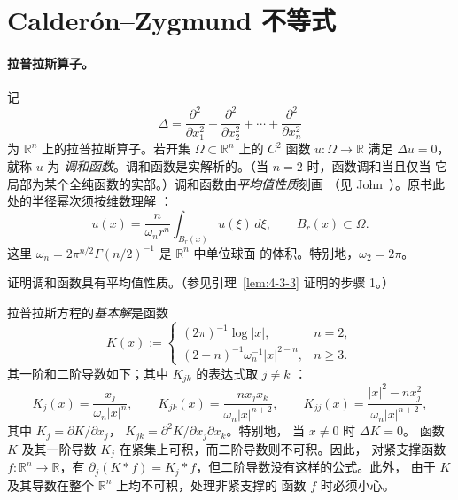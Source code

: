 
\section{Calderón--Zygmund 不等式}\label{sec:B-2}

\paragraph{拉普拉斯算子。}
记
\[
  \Delta=\frac{\partial^2}{\partial x_1^2}
  +\frac{\partial^2}{\partial x_2^2}
  +\cdots+\frac{\partial^2}{\partial x_n^2}
\]
为 $\mathbb R^n$ 上的拉普拉斯算子。若开集 $\Omega\subset\mathbb R^n$ 上的
$C^2$ 函数 $u:\Omega\to\mathbb R$ 满足 $\Delta u=0$，就称 $u$ 为
\emph{调和函数}。调和函数是实解析的。（当 $n=2$ 时，函数调和当且仅当
它局部为某个全纯函数的实部。）调和函数由\emph{平均值性质}刻画
（见 John~）。原书此处的半径幂次须按维数理解
：
\[
  u(x)=\frac{n}{\omega_n r^n}\int_{B_r(x)}u(\xi)\,d\xi,
  \qquad B_r(x)\subset\Omega.
\]
这里 $\omega_n=2\pi^{n/2}\Gamma(n/2)^{-1}$ 是 $\mathbb R^n$ 中单位球面
的体积。特别地，$\omega_2=2\pi$。

\begin{exercise}\label{ex:B-2-1}
证明调和函数具有平均值性质。（参见引理~\ref{lem:4-3-3} 证明的步骤 1。）
\end{exercise}

拉普拉斯方程的\emph{基本解}是函数
\begin{equation}\label{eq:B-2-1}
  K(x):=\begin{cases}
    (2\pi)^{-1}\log|x|, & n=2,\\
    (2-n)^{-1}\omega_n^{-1}|x|^{2-n}, & n\ge3.
  \end{cases}
\end{equation}
其一阶和二阶导数如下；其中 $K_{jk}$ 的表达式取 $j\ne k$
：
\[
  K_j(x)=\frac{x_j}{\omega_n|x|^n},\qquad
  K_{jk}(x)=\frac{-nx_jx_k}{\omega_n|x|^{n+2}},\qquad
  K_{jj}(x)=\frac{|x|^2-nx_j^2}{\omega_n|x|^{n+2}},
\]
其中 $K_j=\partial K/\partial x_j$，
$K_{jk}=\partial^2K/\partial x_j\partial x_k$。特别地，
当 $x\ne0$ 时 $\Delta K=0$。
函数 $K$ 及其一阶导数 $K_j$ 在紧集上可积，而二阶导数则不可积。因此，
对紧支撑函数 $f:\mathbb R^n\to\mathbb R$，有
$\partial_j(K*f)=K_j*f$，但二阶导数没有这样的公式。此外，
由于 $K$ 及其导数在整个 $\mathbb R^n$ 上均不可积，处理非紧支撑的
函数 $f$ 时必须小心。


